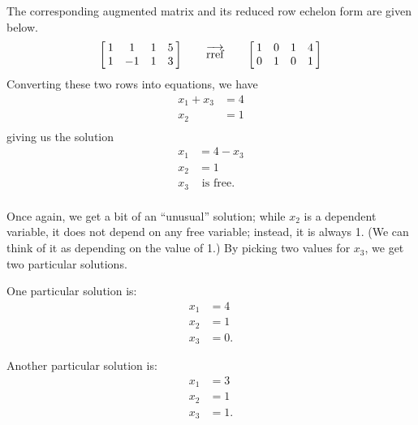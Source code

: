 {The corresponding augmented matrix and its reduced row echelon form are given below.$$\bmx{cccc}1&1&1&5\\1&-1&1&3\\ \emx\quad \quad \overrightarrow{\text{rref}}\quad\quad \bmx{cccc}1&0&1&4\\0&1&0&1\\ \emx$$ Converting these two rows into equations, we have \begin{align*} x_1+x_3&=4\\x_2&=1\\ \end{align*} giving us the solution \begin{align*} x_1&= 4-x_3\\x_2&=1\\x_3 &\text{ is free}.\\ \end{align*}

Once again, we get a bit of an ``unusual'' solution; while $x_2$ is a dependent variable, it does not depend on any free variable; instead, it is always 1. (We can think of it as depending on the value of 1.) By picking two values for $x_3$, we get two particular solutions.
\begin{center}
\begin{minipage}{.4\linewidth}
One particular solution is:
\begin{align*} x_1 &= 4\\ x_2 &=1 \\ x_3 &= 0 . \end{align*}
\end{minipage}
\begin{minipage}{.4\linewidth}
Another particular solution is:
\begin{align*} x_1 &= 3\\ x_2 &=1 \\ x_3 &= 1 . \end{align*}
\end{minipage}
\end{center}
 }\\ %

